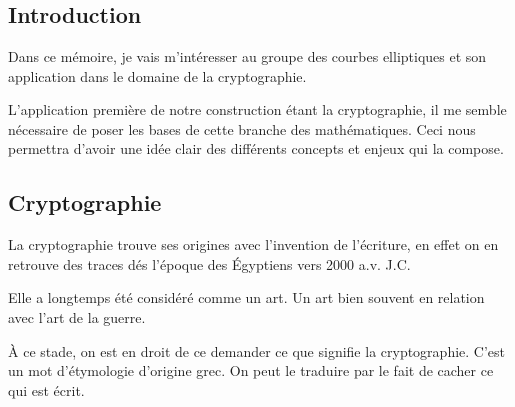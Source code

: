 \chapter{}




\section{Introduction}

Dans ce mémoire, je vais m'intéresser au groupe des courbes elliptiques et son application dans le
domaine de la cryptographie.

L'application première de notre construction étant la cryptographie, il me semble nécessaire de
poser les bases de cette branche des mathématiques. Ceci nous permettra d'avoir une idée clair
des différents concepts et enjeux qui la compose.

\section{Cryptographie}

La cryptographie trouve ses origines avec l'invention de l'écriture, en effet on en
retrouve des traces dés l'époque des Égyptiens vers 2000 a.v. J.C.

Elle a longtemps été considéré comme un art. Un art bien souvent en relation avec l'art de
la guerre.

À ce stade, on est en droit de ce demander ce que signifie la cryptographie. C'est un mot
d'étymologie d'origine grec. On peut le traduire par le fait de cacher ce qui est écrit.

